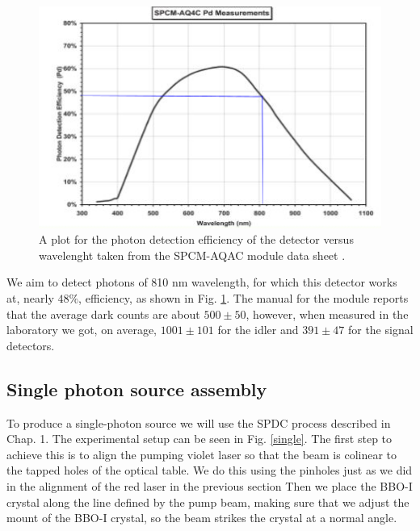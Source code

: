 \documentclass[12pt]{book}
\begin{document}
\begin{figure}[t!]
\centering
\includegraphics[scale=1]{images/effiency.png}
\caption{A plot for the photon detection efficiency of the detector versus wavelenght taken from the SPCM-AQAC module data sheet \cite{manual}.}
\label{module}
\end{figure}

We aim to detect photons of 810 nm wavelength, for which this detector works at, nearly $48\%$, efficiency, as shown in Fig. \ref{module}. The manual for the module \cite{manual} reports that the average dark counts are about $500\pm 50$, however, when measured in the laboratory we got, on average, $ 1001 \pm 101$ for the idler and $391 \pm 47$ for the signal detectors.

\subsection{Single photon source assembly}

To produce a single-photon source we will use the SPDC process described in Chap. 1. The experimental setup can be seen in Fig. \ref{single}. The first step to achieve this is to align the pumping violet laser so that the beam is colinear to the tapped holes of the optical table. We do this using the pinholes just as we did in the alignment of the red laser in the previous section Then we place the BBO-I crystal along the line defined by the pump beam, making sure that we adjust the mount of the BBO-I crystal, so the beam strikes the crystal at a normal angle.
\end{document}
